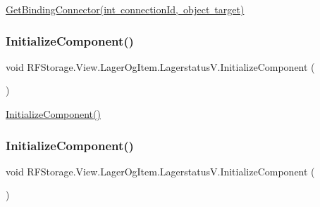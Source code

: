 \mbox{\hyperlink{class_r_f_storage_1_1_view_1_1_lager_og_item_1_1_lagerstatus_v_ab4f51395e6c25555fcf55a3802b4e4e0}{Get\+Binding\+Connector(int connection\+Id, object target)}} 

\mbox{\label{class_r_f_storage_1_1_view_1_1_lager_og_item_1_1_lagerstatus_v_a1c5ef5b6d4087715c569466b9fc5dfbc}} 
\subsubsection{\texorpdfstring{InitializeComponent()}{InitializeComponent()}\hspace{0.1cm}{\footnotesize\ttfamily [1/8]}}
{\footnotesize\ttfamily void R\+F\+Storage.\+View.\+Lager\+Og\+Item.\+Lagerstatus\+V.\+Initialize\+Component (\begin{DoxyParamCaption}{ }\end{DoxyParamCaption})}



\mbox{\hyperlink{class_r_f_storage_1_1_view_1_1_lager_og_item_1_1_lagerstatus_v_a1c5ef5b6d4087715c569466b9fc5dfbc}{Initialize\+Component()}} 

\mbox{\label{class_r_f_storage_1_1_view_1_1_lager_og_item_1_1_lagerstatus_v_a1c5ef5b6d4087715c569466b9fc5dfbc}} 
\subsubsection{\texorpdfstring{InitializeComponent()}{InitializeComponent()}\hspace{0.1cm}{\footnotesize\ttfamily [2/8]}}
{\footnotesize\ttfamily void R\+F\+Storage.\+View.\+Lager\+Og\+Item.\+Lagerstatus\+V.\+Initialize\+Component (\begin{DoxyParamCaption}{ }\end{DoxyParamCaption})}



